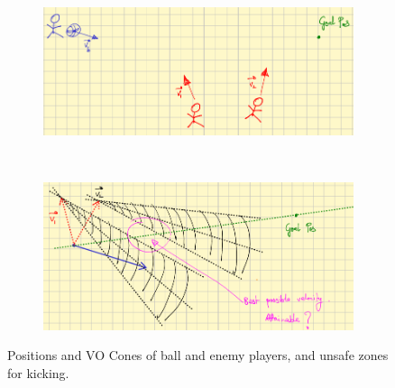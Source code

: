 \documentclass[a4paper,12pt]{article}
\begin{document}
\begin{figure}[!hptb]
  \centering
  \begin{subfigure}[b]{0.45\textwidth}
    \centering
    \includegraphics[width=\textwidth]{./figures/soccer_kick_setup.png}
    \caption{}
    \label{fig:soccer_kick_setting}
  \end{subfigure}
  ~
  \begin{subfigure}[b]{0.45\textwidth}
    \centering
    \includegraphics[width=\textwidth]{./figures/soccer_kick_VO_cones.png}
    \caption{}
    \label{fig:soccer_VO_kick_initial_setup}
  \end{subfigure}
  \caption{Positions and VO Cones of ball and enemy players, and  unsafe zones for kicking.}
  \label{fig:soccer_kicks}
\end{figure}


\end{document}
